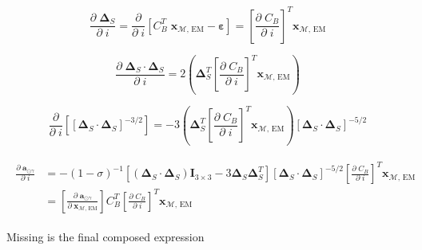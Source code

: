 \documentclass[]{article}
\newcommand{\pd}[2]{\frac{\partial\;#1}{\partial\;#2}}
\newcommand{\pddown}[2]{\frac{\partial}{\partial\;#2} \left[ #1 \right] }
\begin{document}
	\begin{equation*}
		\pd{\boldsymbol{\Delta}_S}{i} = \pddown{C_B^T \; \mathbf{x}_{\mathcal{M}\text{, EM}} - \boldsymbol{\varepsilon}}{i} = \left[ \pd{C_B}{i} \right]^T \mathbf{x}_{\mathcal{M}\text{, EM}}
	\end{equation*}
	
	\begin{equation*}
		\pd{\boldsymbol{\Delta}_S \cdot \boldsymbol{\Delta}_S}{i} = 2\left( \boldsymbol{\Delta}_S^T \left[ \pd{C_B}{i} \right]^T \mathbf{x}_{\mathcal{M}\text{, EM}} \right)
	\end{equation*}
	
	\begin{equation*}
		\pddown{ [\boldsymbol{\Delta}_S \cdot \boldsymbol{\Delta}_S]^{-3/2} }{i} = -3 \left( \boldsymbol{\Delta}_S^T \left[ \pd{C_B}{i} \right]^T \mathbf{x}_{\mathcal{M}\text{, EM}} \right) [\boldsymbol{\Delta}_S \cdot \boldsymbol{\Delta}_S]^{-5/2}
	\end{equation*}
	
	\begin{align}
	\begin{split}
		\pd{\mathbf{a}_{\odot\gamma}}{i}
		&= -(1 - \sigma)^{-1} \left[ (\boldsymbol{\Delta}_S \cdot \boldsymbol{\Delta}_S)\mathbf{I}_{3\times 3} - 3 \boldsymbol{\Delta}_S \boldsymbol{\Delta}_S^T \right] [\boldsymbol{\Delta}_S \cdot \boldsymbol{\Delta}_S]^{-5/2} \left[ \pd{C_B}{i} \right]^T \mathbf{x}_{\mathcal{M}\text{, EM}} \\
		&= \left[\pd{\mathbf{a}_{\odot\gamma}}{ \mathbf{x}_{\mathcal{M}\text{, EM}} }\right] C_B^T \left[ \pd{C_B}{i} \right]^T \mathbf{x}_{\mathcal{M}\text{, EM}}
	\end{split}
	\end{align}
	
	Missing is the final composed expression
	
\end{document}
